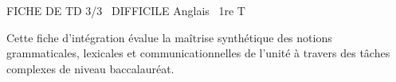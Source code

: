 \documentclass[11pt]{article}
\begin{document}
\begin{tcolorbox}[enhanced,colback=popink,colframe=popink,arc=10pt,boxrule=0pt,left=12pt,right=12pt,top=9pt,bottom=9pt]
{\color{white}\popxbold\small FICHE DE TD 3/3 \textbullet\ DIFFICILE \hfill Anglais \textbullet\ 1re T\par}
\end{tcolorbox}
\vspace{4pt}
Cette fiche d'intégration évalue la maîtrise synthétique des notions grammaticales, lexicales et communicationnelles de l'unité à travers des tâches complexes de niveau baccalauréat.
\end{document}
